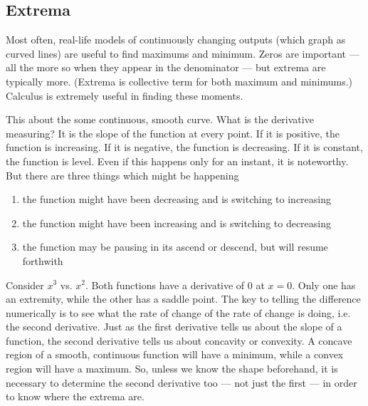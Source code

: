 

\subsection{Extrema}
Most often, real-life models of continuously changing outputs (which graph as curved lines)
are useful to find maximums and minimum.  Zeros are important --- all the more so when
they appear in the denominator --- but extrema are typically more.  (Extrema is collective
term for both maximum and minimums.)  Calculus is extremely useful in finding these moments.

This about the some continuous, smooth curve.  What is the derivative measuring?  It is the
slope of the function at every point.  If it is positive, the function is increasing.  If it is
negative, the function is decreasing.  If it is constant, the function is level.  Even if this happens
only for an instant, it is noteworthy.  But there are three things which might be happening
\begin{enumerate}
\item the function might have been decreasing and is switching to increasing
\item the function might have been increasing and is switching to decreasing
\item the function may be pausing in its ascend or descend, but will resume forthwith
\end{enumerate}

Consider $x^3$ vs. $x^2$.  Both functions have a derivative of 0 at $x=0$.  Only one has
an extremity, while the other has a saddle point.  The key to telling the difference numerically
is to see what the rate of change of the rate of change is doing, i.e. the second derivative.
Just as the first derivative tells us about the slope of a function, the second derivative tells us about
concavity or convexity.  A concave region of a smooth, continuous function will have a minimum,
while a convex region will have a maximum.  So, unless we know the shape beforehand,
it is necessary to determine the second derivative too --- not just the first --- in order to know
where the extrema are.


